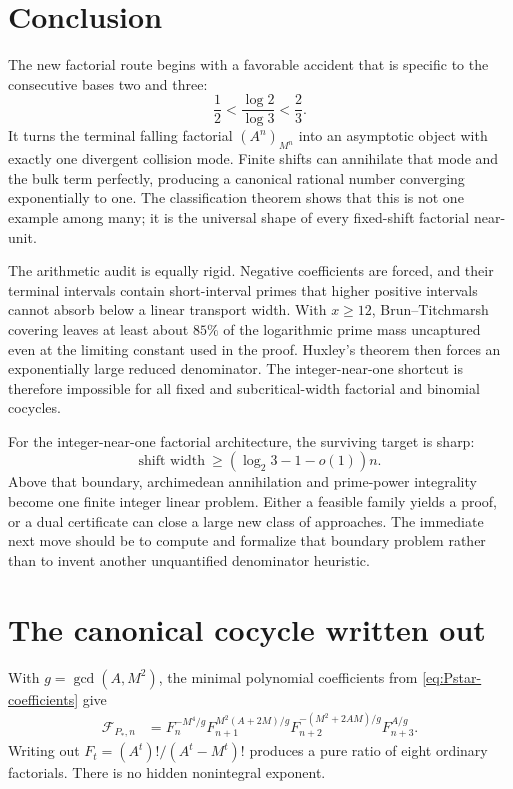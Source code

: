 \documentclass[11pt,oneside]{article}
\theoremstyle{definition}
\theoremstyle{remark}
\newcommand{\cF}{\mathcal F}
\begin{document}
\section{Conclusion}
\label{sec:conclusion}

The new factorial route begins with a favorable accident that is specific to the consecutive
bases two and three:
\[
 \frac12<\frac{\log2}{\log3}<\frac23.
\]
It turns the terminal falling factorial $(A^n)_{M^n}$ into an asymptotic object with exactly
one divergent collision mode.  Finite shifts can annihilate that mode and the bulk term
perfectly, producing a canonical rational number converging exponentially to one.  The
classification theorem shows that this is not one example among many; it is the universal
shape of every fixed-shift factorial near-unit.

The arithmetic audit is equally rigid.  Negative coefficients are forced, and their terminal
intervals contain short-interval primes that higher positive intervals cannot absorb below a
linear transport width.  With $x\ge12$, Brun--Titchmarsh covering leaves at least about
$85\%$ of the logarithmic prime mass uncaptured even at the limiting constant used in the
proof.  Huxley's theorem then forces an exponentially large reduced denominator.  The
integer-near-one shortcut is therefore impossible for all fixed and subcritical-width
factorial and binomial cocycles.

For the integer-near-one factorial architecture, the surviving target is sharp:
\[
 \text{shift width}\ \ge
 (\log_2 3-1-o(1))n.
\]
Above that boundary, archimedean annihilation and prime-power integrality become one finite
integer linear problem.  Either a feasible family yields a proof, or a dual certificate can
close a large new class of approaches.  The immediate next move should be to compute and
formalize that boundary problem rather than to invent another unquantified denominator
heuristic.

\appendix

\section{The canonical cocycle written out}
\label{app:canonical}

With $g=\gcd(A,M^2)$, the minimal polynomial coefficients from
\eqref{eq:Pstar-coefficients} give
\begin{align}
 \cF_{P_*,n}
 &=F_n^{-M^4/g}
   F_{n+1}^{M^2(A+2M)/g}
   F_{n+2}^{-(M^2+2AM)/g}
   F_{n+3}^{A/g}.
 \label{eq:canonical-expanded}
\end{align}
Writing out $F_t=(A^t)!/(A^t-M^t)!$ produces a pure ratio of eight ordinary factorials.
There is no hidden nonintegral exponent.
\end{document}
